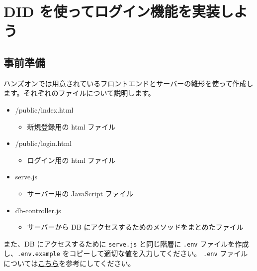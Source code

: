\section{DID
を使ってログイン機能を実装しよう}\label{did-ux3092ux4f7fux3063ux3066ux30edux30b0ux30a4ux30f3ux6a5fux80fdux3092ux5b9fux88c5ux3057ux3088ux3046}

\subsection{事前準備}\label{ux4e8bux524dux6e96ux5099}

ハンズオンでは用意されているフロントエンドとサーバーの雛形を使って作成します。それぞれのファイルについて説明します。

\begin{itemize}
\tightlist
\item
  /public/index.html

  \begin{itemize}
  \tightlist
  \item
    新規登録用の html ファイル
  \end{itemize}
\item
  /public/login.html

  \begin{itemize}
  \tightlist
  \item
    ログイン用の html ファイル
  \end{itemize}
\item
  serve.js

  \begin{itemize}
  \tightlist
  \item
    サーバー用の JavaScript ファイル
  \end{itemize}
\item
  db-controller.js

  \begin{itemize}
  \tightlist
  \item
    サーバーから DB にアクセスするためのメソッドをまとめたファイル
  \end{itemize}
\end{itemize}

また、DB にアクセスするために \texttt{serve.js} と同じ階層に
\texttt{.env} ファイルを作成し、\texttt{.env.example}
をコピーして適切な値を入力してください。 \texttt{.env}
ファイルについては\href{https://github.com/jigintern/intern-dev-tutorial/blob/main/database-tutorial/docs.md\#3-deno\%E3\%81\%8B\%E3\%82\%89mysql\%E3\%81\%AB\%E3\%82\%A2\%E3\%82\%AF\%E3\%82\%BB\%E3\%82\%B9\%E3\%81\%97\%E3\%81\%A6\%E3\%81\%BF\%E3\%82\%88\%E3\%81\%86}{こちら}を参考にしてください。

